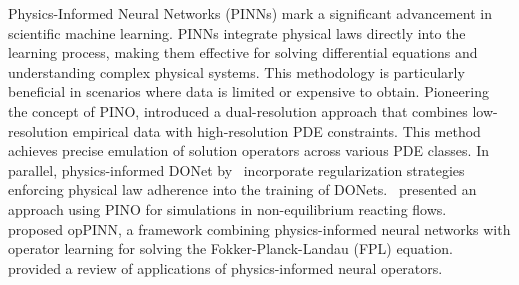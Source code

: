 Physics-Informed Neural Networks (PINNs) \citep{raissi2019physics} 
 mark a significant advancement in scientific machine learning. PINNs integrate physical laws directly into the learning process, making them effective for solving differential equations and understanding complex physical systems. This methodology is particularly beneficial in scenarios where data is limited or expensive to obtain.
 Pioneering the concept of PINO, \citet{li2021physics} introduced a dual-resolution approach that combines low-resolution empirical data with high-resolution PDE constraints. This method achieves precise emulation of solution operators across various PDE classes. In parallel, physics-informed DONet by~\citet{wang2021learning} incorporate regularization strategies enforcing physical law adherence into the training of DONets.~\citet{zanardi2023adaptive} presented an approach using PINO for simulations in non-equilibrium reacting flows.  ~\citet{lee2023oppinn} proposed opPINN, a framework combining physics-informed neural networks with operator learning for solving the Fokker-Planck-Landau (FPL) equation. ~\citet{rosofsky2023applications} provided a review of applications of physics-informed neural operators. %
